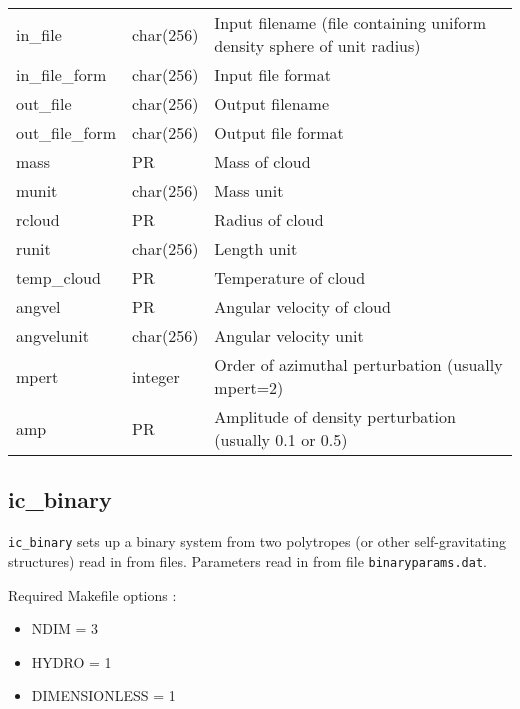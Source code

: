 \documentclass[a4paper]{article}
\newcommand{\var}[1]{\texttt{#1}}
\begin{document}
\tabletail{\hline}
\tablelasttail{\hline}
\begin{center}
\begin{supertabular}{|p{3cm}|p{2cm}|p{8cm}|}
in\_file         & char(256) & Input filename (file containing uniform density sphere of unit radius) \\
in\_file\_form   & char(256) & Input file format \\
out\_file        & char(256) & Output filename \\
out\_file\_form  & char(256) & Output file format \\
mass             & PR       & Mass of cloud \\
munit            & char(256) & Mass unit \\
rcloud           & PR       & Radius of cloud \\
runit            & char(256) & Length unit \\
temp\_cloud      & PR       & Temperature of cloud \\
angvel           & PR       & Angular velocity of cloud \\
angvelunit       & char(256) & Angular velocity unit \\
mpert            & integer  & Order of azimuthal perturbation (usually mpert=2) \\
amp              & PR       & Amplitude of density perturbation (usually 0.1 or 0.5)\\
\end{supertabular}
\end{center}

\newpage


\subsection{ic\_binary}
\var{ic\_binary} sets up a binary system from two polytropes (or other self-gravitating structures) read in from files.  Parameters read in from file \var{binaryparams.dat}. \newline

\noindent Required Makefile options :
\begin{itemize}
\item NDIM = 3
\item HYDRO = 1
\item DIMENSIONLESS = 1
\end{itemize}
\vspace{0.1cm}
\end{document}
